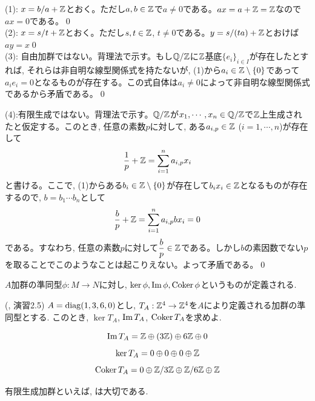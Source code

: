 \begin{egans}
(1): $x=b/a + \mathbb{Z}$とおく。ただし$a,b\in \mathbb{Z}$で$a\neq 0$である。$ax = a+\mathbb{Z} = \mathbb{Z}$なので$ax = 0$である。\qed\\
(2): $x=s/t + \mathbb{Z}$とおく。ただし$s,t\in \mathbb{Z}$, $t\neq 0$である。$y=s/(ta ) + \mathbb{Z}$とおけば$ay = x$\qed \\
(3): 自由加群ではない。背理法で示す。もし$\mathbb{Q}/\mathbb{Z}$に$\mathbb{Z}$基底$\{ e_i\}_{i\in I}$が存在したとすれば, それらは非自明な線型関係式を持たないが, (1)から$a_i\in\mathbb{Z}\setminus{\{ 0 \}}$であって $a_i e_i = 0$となるものが存在する。この式自体は$a_i\neq 0$によって非自明な線型関係式であるから矛盾である。\qed

(4):有限生成ではない。背理法で示す。$\mathbb{Q}/\mathbb{Z}$が$x_1,\cdots,x_n\in \mathbb{Q}/\mathbb{Z}$で$\mathbb{Z}$上生成されたと仮定する。このとき, 任意の素数$p$に対して, ある$a_{i,p}\in \mathbb{Z}$ ($i=1,\cdots, n$)が存在して
\[\dfrac{1}{p} + \mathbb{Z} = \sum_{i=1}^{n} a_{i,p}x_i\]
と書ける。ここで, (1)からある$b_i\in\mathbb{Z}\setminus{\{ 0 \}}$が存在して$b_ix_i \in \mathbb{Z}$となるものが存在するので, $b=b_1\cdots b_n$として
\[\dfrac{b}{p} + \mathbb{Z} = \sum_{i=1}^{n}a_{i,p}bx_i = 0\]
である。すなわち, 任意の素数$p$に対して$\dfrac{b}{p} \in \mathbb{Z}$である。しかし$b$の素因数でない$p$を取ることでこのようなことは起こりえない。よって矛盾である。\qed
\end{egans}

$A$加群の準同型$\phi:M\to N$に対し, $\ker{\phi}, \mathrm{Im}\,\phi, \mathrm{Coker}\,\phi$というものが定義される.


\begin{egprob} (\cite{aoyukie}, 演習2.5)
$A= \mathrm{diag}(1,3,6,0)$とし, $T_A:\mathbb{Z}^4\to \mathbb{Z}^4$を$A$により定義される加群の準同型とする. このとき, $\ker{T_A}$, $\mathrm{Im}\,T_A$, $\mathrm{Coker}\,T_A$を求めよ.
\end{egprob}
\begin{egans}
\[\mathrm{Im}\,T_A = \mathbb{Z}\oplus (3\mathbb{Z})\oplus 6\mathbb{Z} \oplus 0\]
\[\ker{T_A} = 0\oplus 0\oplus 0\oplus \mathbb{Z} \]
\[\mathrm{Coker}\,T_A = 0\oplus \mathbb{Z}/3\mathbb{Z} \oplus \mathbb{Z}/6\mathbb{Z} \oplus \mathbb{Z}\]
\end{egans}



有限生成加群といえば, は大切である.


